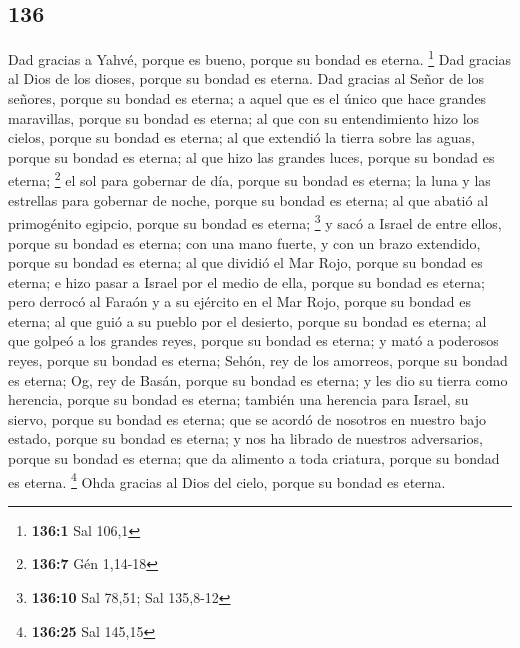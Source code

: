 \begin{paracol}{2}
\hypertarget{section-270}{%
\section{136}\label{section-270}}

 Dad gracias a Yahvé, porque es bueno, porque su bondad es
eterna. \footnote{\textbf{136:1} Sal 106,1}  Dad gracias
al Dios de los dioses, porque su bondad es eterna.  Dad
gracias al Señor de los señores, porque su bondad es eterna;
 a aquel que es el único que hace grandes maravillas,
porque su bondad es eterna;  al que con su entendimiento
hizo los cielos, porque su bondad es eterna;  al que
extendió la tierra sobre las aguas, porque su bondad es eterna;
 al que hizo las grandes luces, porque su bondad es
eterna; \footnote{\textbf{136:7} Gén 1,14-18}  el sol para
gobernar de día, porque su bondad es eterna;  la luna y
las estrellas para gobernar de noche, porque su bondad es eterna;
 al que abatió al primogénito egipcio, porque su bondad
es eterna; \footnote{\textbf{136:10} Sal 78,51; Sal 135,8-12}
 y sacó a Israel de entre ellos, porque su bondad es
eterna;  con una mano fuerte, y con un brazo extendido,
porque su bondad es eterna;  al que dividió el Mar Rojo,
porque su bondad es eterna;  e hizo pasar a Israel por el
medio de ella, porque su bondad es eterna;  pero derrocó
al Faraón y a su ejército en el Mar Rojo, porque su bondad es eterna;
 al que guió a su pueblo por el desierto, porque su
bondad es eterna;  al que golpeó a los grandes reyes,
porque su bondad es eterna;  y mató a poderosos reyes,
porque su bondad es eterna;  Sehón, rey de los amorreos,
porque su bondad es eterna;  Og, rey de Basán, porque su
bondad es eterna;  y les dio su tierra como herencia,
porque su bondad es eterna;  también una herencia para
Israel, su siervo, porque su bondad es eterna;  que se
acordó de nosotros en nuestro bajo estado, porque su bondad es eterna;
 y nos ha librado de nuestros adversarios, porque su
bondad es eterna;  que da alimento a toda criatura,
porque su bondad es eterna. \footnote{\textbf{136:25} Sal 145,15}
 Ohda gracias al Dios del cielo, porque su bondad es
eterna.

\switchcolumn
\begin{otherlanguage}{english}


\end{otherlanguage}
\end{paracol}
